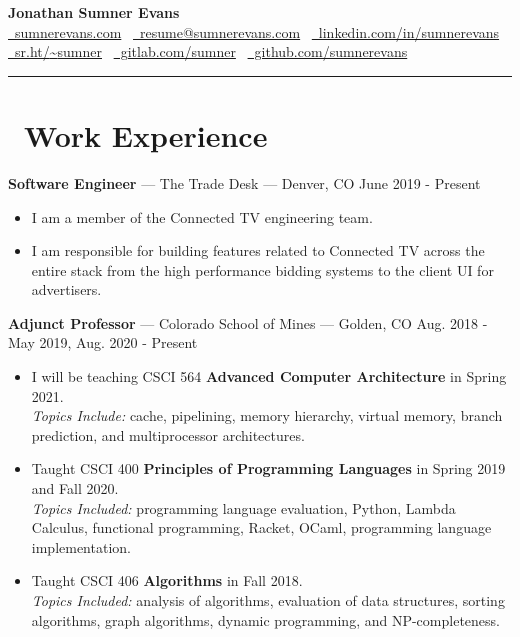 \documentclass[10pt,letterpaper]{article}
\begin{document}
\begin{center}
    {\huge\textbf{Jonathan Sumner Evans}} \\
    \vspace{3pt}
    \href{https://sumnerevans.com}{\faGlobe\ sumnerevans.com}
    \textbar\ \href{mailto:resume@sumnerevans.com}{\faEnvelope\ resume@sumnerevans.com}
    \textbar\ \href{https://www.linkedin.com/in/sumnerevans}{\faLinkedin\ linkedin.com/in/sumnerevans} \\
    \href{https://sr.ht/~sumner}{\faCodeFork\ sr.ht/{\textasciitilde}sumner}
    \textbar\ \href{https://gitlab.com/sumner}{\faGitlab\ gitlab.com/sumner}
    \textbar\ \href{https://github.com/sumnerevans}{\faGithub\ github.com/sumnerevans}
    \rule{\textwidth}{0.5pt}
\end{center}

\section*{\faBriefcase\ Work Experience}
\textbf{Software Engineer} --- The Trade Desk --- Denver, CO
\hfill June 2019 - Present
\begin{itemize}
    \item I am a member of the Connected TV engineering team.
    \item I am responsible for building features related to Connected TV across
        the entire stack from the high performance bidding systems to the client
        UI for advertisers.
\end{itemize}

\textbf{Adjunct Professor} --- Colorado School of Mines --- Golden, CO
\hfill Aug. 2018 - May 2019, Aug. 2020 - Present
\begin{itemize}
    \item I will be teaching CSCI 564 \textbf{Advanced Computer Architecture} in
        Spring 2021. \\
        \textit{Topics Include:} cache, pipelining, memory hierarchy, virtual
        memory, branch prediction, and multiprocessor architectures.
    \item Taught CSCI 400 \textbf{Principles of Programming Languages} in Spring
        2019 and Fall 2020. \\
        \textit{Topics Included:} programming language evaluation, Python,
        Lambda Calculus, functional programming, Racket, OCaml, programming
        language implementation.
    \item Taught CSCI 406 \textbf{Algorithms} in Fall 2018. \\
        \textit{Topics Included:} analysis of algorithms, evaluation of data
        structures, sorting algorithms, graph algorithms, dynamic programming,
        and NP-completeness.
\end{itemize}
\end{document}
